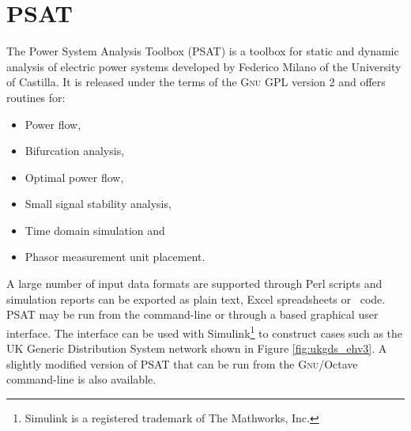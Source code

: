 \section{PSAT}
\label{sec:psat}
The Power System Analysis Toolbox (PSAT) is a \matlab toolbox for static and
dynamic analysis of electric power systems developed by Federico Milano of the
University of Castilla. It is released under the terms of the \textsc{Gnu} GPL
version 2 and offers routines for:
\begin{itemize}
	\item Power flow,
	\item Bifurcation analysis,
	\item Optimal power flow,
	\item Small signal stability analysis,
	\item Time domain simulation and
	\item Phasor measurement unit placement.
\end{itemize}
A large number of input data formats are supported through Perl scripts and
simulation reports can be exported as plain text, Excel spreadsheets or
\LaTeXe~code.  PSAT may be run from the \matlab command-line or through a
\matlab based graphical user interface.  The interface can be used with
Simulink\footnote{Simulink is a registered trademark of The Mathworks, Inc.}
to construct cases such as the UK Generic Distribution System network
shown in Figure \ref{fig:ukgds_ehv3}.  A slightly modified version of PSAT that
can be run from the \textsc{Gnu}/Octave command-line is also available.

